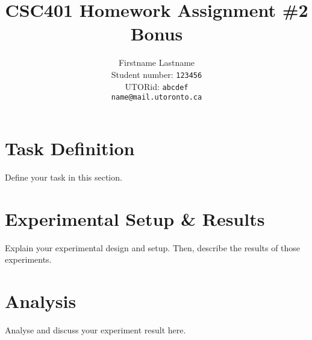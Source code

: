 \documentclass[11pt]{article}
\title{CSC401 Homework Assignment \#2\\Bonus}
\author{Firstname Lastname \\
  Student number: \texttt{123456} \\
  UTORid: \texttt{abcdef} \\
  \texttt{name@mail.utoronto.ca}}
\begin{document}
\maketitle
\section{Task Definition}
Define your task in this section.
\section{Experimental Setup \& Results}
Explain your experimental design and setup.  Then, describe the results of those experiments.
\section{Analysis}
Analyse and discuss your experiment result here.
\end{document}
